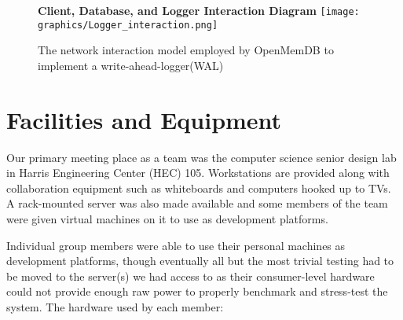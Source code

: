 \documentclass[letterpaper, 12pt]{article}
\begin{document}
  \begin{figure}
    \centering
    \textbf{Client, Database, and Logger Interaction Diagram}
    \texttt{[image: graphics/Logger\_interaction.png]}
    \caption{The network interaction model employed by OpenMemDB to implement a
	     write-ahead-logger(WAL)}
    \label{fig:logger_interaction}
  \end{figure}

\newpage

\section{Facilities and Equipment}
Our primary meeting place as a team was the computer science senior design lab in Harris Engineering
Center (HEC) 105. Workstations are provided along with collaboration equipment such as
whiteboards and computers hooked up to TVs. A rack-mounted server was also made available and
some members of the team were given virtual machines on it to use as development
platforms.
\par\vspace{\baselineskip}
Individual group members were able to use their personal machines as development platforms, though
eventually all but the most trivial testing had to be moved to the server(s) we had access to
as their consumer-level hardware could not provide enough raw power to properly benchmark and
stress-test the system. The hardware used by each member:
\end{document}
